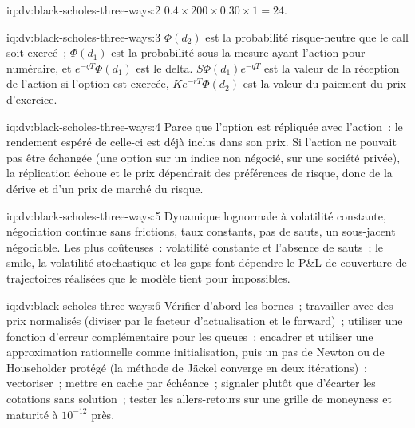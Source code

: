 \begin{solution}{iq:dv:black-scholes-three-ways:2}
$0.4\times200\times0.30\times1=24$.
\end{solution}

\begin{solution}{iq:dv:black-scholes-three-ways:3}
$\Phi(d_2)$ est la probabilité risque-neutre que le call soit exercé~;
$\Phi(d_1)$ est la probabilité sous la mesure ayant l'action pour numéraire, et
$e^{-qT}\Phi(d_1)$ est le delta. $S\Phi(d_1)e^{-qT}$ est la valeur de la réception de
l'action si l'option est exercée, $Ke^{-rT}\Phi(d_2)$ est la valeur du paiement du prix d'exercice.
\end{solution}

\begin{solution}{iq:dv:black-scholes-three-ways:4}
Parce que l'option est répliquée avec l'action~: le rendement espéré de celle-ci est
déjà inclus dans son prix. Si l'action ne pouvait pas être échangée (une option sur un
indice non négocié, sur une société privée), la réplication échoue et le prix
dépendrait des préférences de risque, donc de la dérive et d'un prix de marché du risque.
\end{solution}

\begin{solution}{iq:dv:black-scholes-three-ways:5}
Dynamique lognormale à volatilité constante, négociation continue sans frictions,
taux constants, pas de sauts, un sous-jacent négociable. Les plus coûteuses~: volatilité constante
et l'absence de sauts~; le smile, la volatilité stochastique et les gaps font dépendre le
P\&L de couverture de trajectoires réalisées que le modèle tient pour impossibles.
\end{solution}

\begin{solution}{iq:dv:black-scholes-three-ways:6}
Vérifier d'abord les bornes~; travailler avec des prix normalisés (diviser par le facteur d'actualisation et
le forward)~; utiliser une fonction d'erreur complémentaire pour les queues~; encadrer et utiliser une
approximation rationnelle comme initialisation, puis un pas de Newton ou de Householder protégé
(la méthode de Jäckel converge en deux itérations)~; vectoriser~; mettre en cache par
échéance~; signaler plutôt que d'écarter les cotations sans solution~; tester les allers-retours sur une grille de
moneyness et maturité à $10^{-12}$ près.
\end{solution}
